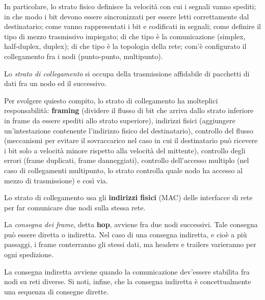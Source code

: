             \vspace{3mm}
            
            In particolare, lo strato fisico definisce la velocità con cui i segnali vanno spediti; in che modo i bit devono essere sincronizzati per essere letti correttamente dal destinatario; come vanno rappresentati i bit e codificati in segnali; come definire il tipo di mezzo trasmissivo impiegato; di che tipo è la comunicazione (simplex, half-duplex, duplex); di che tipo è la topologia della rete; com'è configurato il collegamento fra i nodi (punto-punto, multipunto).
        
        
            Lo \textit{strato di collegamento} si occupa della trasmissione affidabile di pacchetti di dati fra un nodo ed il successivo. 
            
            \vspace{3mm}
            
            Per svolgere quiesto compito, lo strato di collegamento ha molteplici responsabilità: \textbf{framing} (dividere il flusso di bit che arriva dallo strato inferiore in frame da essere spediti allo strato superiore), indirizzi fisici (aggiungere un'intestazione contenente l'indirizzo fisico del destinatario), controllo del flusso (meccanismi per evitare il sovraccarico nel caso in cui il destinatario può ricevere i bit solo a velocità minore rispetto alla velocità del mittente), controllo degli errori (frame duplicati, frame danneggiati), controllo dell'accesso multiplo (nel caso di collegamenti multipunto, lo strato controlla quale nodo ha accesso al mezzo di trasmissione) e così via.
            
            \vspace{3mm}
            
            Lo strato di collegamento usa gli \textbf{indirizzi fisici} (MAC) delle interfacce di rete per far comunicare due nodi sulla stessa rete.
            
            \vspace{3mm}
            
            La \textit{consegna dei frame}, detta \textbf{hop}, avviene fra due nodi successivi. Tale consegna può essere diretta o indiretta. Nel caso di una consegna indiretta, e cioè a più passaggi, i frame conterranno gli stessi dati, ma headers e trailers varieranno per ogni spedizione. 
            
            La consegna indiretta avviene quando la comunicazione dev'essere stabilita fra nodi su reti diverse. Si noti, infine, che la consegna indiretta è concettualmente una sequenza di consegne dirette.
        
